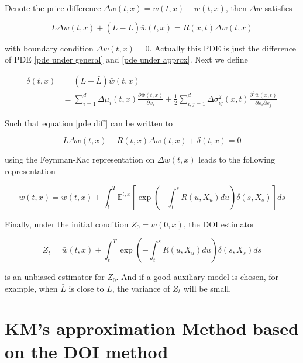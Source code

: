 Denote the price difference $\Delta w(t,x) = w(t,x) - \bar{w}(t,x)$, then $\Delta w$ satisfies 

\begin{equation}\label{pde diff}
    L \Delta w(t, x)+ (L-\bar{L}) \bar{w}(t,x)=R(x, t) \Delta w(t, x)
\end{equation}

\noindent with boundary condition $\Delta w(t,x) = 0$. Actually this PDE is just the difference of PDE \eqref{pde under general} and \eqref{pde under approx}. Next we define

\begin{equation}\label{mis-pricing}
    \begin{aligned}
        \delta(t,x) &= (L-\bar{L}) \bar{w}(t,x) \\
        &=\sum_{i=1}^{d} \Delta \mu_{i}(t,x) \frac{\partial \bar{w}(t,x)}{\partial x_{i}}+\frac{1}{2} \sum_{i, j=1}^{d} \Delta \sigma_{i j}^{2}(x, t) \frac{\partial^{2} \bar{w}(x,t)}{\partial x_{i} \partial x_{j}}
    \end{aligned}
\end{equation}

Such that equation \eqref{pde diff} can be written to

$$
L \Delta w(t,x) - R(t,x)\Delta w(t,x) + \delta(t,x) = 0
$$

\noindent using the Feynman-Kac representation on $\Delta w(t,x)$ leads to the following representation

\begin{equation}\label{feynman-kac rep}
        w(t, x)=\bar{w}(t,x)+\int_{t}^{T} \mathbb{E}^{t,x}\left[\exp \left(-\int_{t}^{s} R(u, X_u) d u\right) \delta(s,X_s)\right] d s
\end{equation}

\noindent Finally, under the initial condition $Z_0 = w(0,x)$, the DOI estimator

\begin{equation}
        Z_t =\bar{w}(t, x)+\int_{t}^{T} \exp \left(-\int_{t}^{s} R(u, X_u) d u\right) \delta(s,X_s)d s
\end{equation}

\noindent is an unbiased estimator for $Z_0$. And if a good auxiliary model is chosen, for example, when $\bar{L}$ is close to $L$, the variance of $Z_t$ will be small.

\section{KM's approximation Method based on the DOI method}
\label{sec: 2.2}

